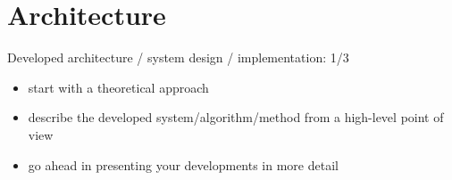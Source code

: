 \chapter{Architecture}

Developed architecture / system design / implementation: 1/3 

\begin{itemize}
\item start with a theoretical approach
\item describe the developed system/algorithm/method from a high-level point of view
\item go ahead in presenting your developments in more detail 
\end{itemize}
